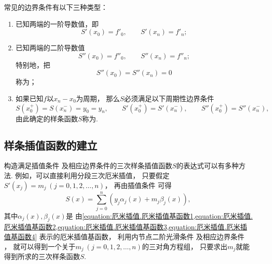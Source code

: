 常见的边界条件有以下三种类型：\begin{enumerate}
	\item 已知两端的一阶导数值，即\begin{equation}\label{equation:三次样条插值.边界条件1}
		S'(x_0) = f'_0,
		\qquad
		S'(x_n) = f'_n;
	\end{equation}

	\item 已知两端的二阶导数值\begin{equation}\label{equation:三次样条插值.边界条件2}
		S''(x_0) = f''_0,
		\qquad
		S''(x_n) = f''_n;
	\end{equation}
	特别地，把\begin{equation}\label{equation:三次样条插值.边界条件3}
		S''(x_0) = S''(x_n) = 0
	\end{equation}
	称为；

	\item 如果已知\(f\)以\(x_n-x_0\)为周期，
	那么\(S\)必须满足以下周期性边界条件\begin{equation}\label{equation:三次样条插值.边界条件4}
		S(x_0^+) = S(x_n^-)
		= y_0 = y_n,
		\qquad
		S'(x_0^+) = S'(x_n^-),
		\qquad
		S''(x_0^+) = S''(x_n^-),
	\end{equation}
	由此确定的样条函数\(S\)称为.
\end{enumerate}

\subsection{样条插值函数的建立}
构造满足插值条件 
及相应边界条件的三次样条插值函数\(S\)的表达式可以有多种方法.
例如，可以直接利用分段三次厄米插值，
只要假定\(S'(x_j) = m_j\ (j=0,1,2,\dotsc,n)\)，
再由插值条件 
可得\begin{equation*}
	S(x) = \sum_{j=0}^n (y_j \alpha_j(x) + m_j \beta_j(x)),
\end{equation*}
其中\(\alpha_j(x),\beta_j(x)\)是
由\cref{equation:厄米插值.厄米插值基函数1,equation:厄米插值.厄米插值基函数2,equation:厄米插值.厄米插值基函数3,equation:厄米插值.厄米插值基函数4}
表示的厄米插值基函数，
利用内节点二阶光滑条件 
及相应边界条件
，
就可以得到一个关于\(m_j\ (j=0,1,2,\dotsc,n)\)的三对角方程组，
只要求出\(m_j\)就能得到所求的三次样条函数\(S\).

